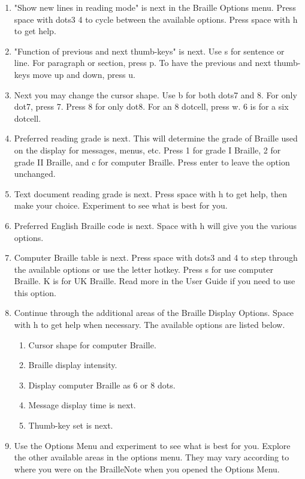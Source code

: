 \documentclass[10pt,letterpaper,twoside]{report}
\begin{document}
{{{\begin{enumerate}
	\item "Show new lines in reading mode" is next in the Braille Options menu. Press space with dots3 4 to cycle between the available options.  Press space with h to get help.
	\item "Function of previous and next thumb-keys" is next.  Use s for sentence or line.  For paragraph or section, press p.  To have the previous and next thumb-keys move up and down, press u.
	\item Next you may change the cursor shape.  Use b for both dots7 and 8.  For only dot7, press 7.  Press 8 for only dot8. For an 8 dotcell, press w.  6 is for a six dotcell.
	\item Preferred reading grade is next.  This will determine the grade of Braille used on the display for messages, menus, etc.  Press 1 for grade I Braille, 2 for grade II Braille, and c for computer Braille.  Press enter to leave the option unchanged.
	\item Text document reading grade is next.  Press space with h to get help, then make your choice.  Experiment to see what is best for you.
	\item Preferred English Braille code is next.  Space with h will give you the various options.
	\item Computer Braille table is next.  Press space with dots3 and 4 to step through the available options or use the letter hotkey.  Press s for use computer Braille.  K is for UK Braille.  Read more in the User Guide if you need to use this option.
	\item Continue through the additional areas of the Braille Display Options. Space with h to get help when necessary.  The available options are listed below.
	      \begin{enumerate}
		      \item Cursor shape for computer Braille.
		      \item Braille display intensity.
		      \item Display computer Braille as 6 or 8 dots.
		      \item Message display time is next.
		      \item Thumb-key set is next.
	      \end{enumerate}
	\item Use the Options Menu and experiment to see what is best for you.  Explore the other available areas in the options menu.  They may vary according to where you were on the BrailleNote when you opened the Options Menu.
\end{enumerate}
\clearpage
}}}
\end{document}
